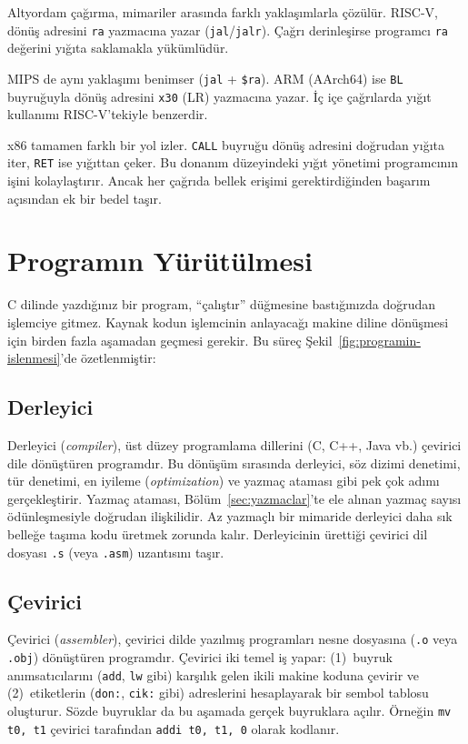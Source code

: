 \begin{karsilastirma}
Altyordam çağırma, mimariler arasında farklı yaklaşımlarla çözülür. RISC-V, dönüş adresini \texttt{ra} yazmacına yazar (\texttt{jal}/\texttt{jalr}). Çağrı derinleşirse programcı \texttt{ra} değerini yığıta saklamakla yükümlüdür.

MIPS de aynı yaklaşımı benimser (\texttt{jal} + \texttt{\$ra}). ARM (AArch64) ise \texttt{BL} buyruğuyla dönüş adresini \texttt{x30} (LR) yazmacına yazar. İç içe çağrılarda yığıt kullanımı RISC-V'tekiyle benzerdir.

x86 tamamen farklı bir yol izler. \texttt{CALL} buyruğu dönüş adresini doğrudan yığıta iter, \texttt{RET} ise yığıttan çeker. Bu donanım düzeyindeki yığıt yönetimi programcının işini kolaylaştırır. Ancak her çağrıda bellek erişimi gerektirdiğinden başarım açısından ek bir bedel taşır.
\end{karsilastirma}

\section{Programın Yürütülmesi}
\label{sec:program-yurutme}

C dilinde yazdığınız bir program, ``çalıştır'' düğmesine bastığınızda doğrudan işlemciye gitmez. Kaynak kodun işlemcinin anlayacağı makine diline dönüşmesi için birden fazla aşamadan geçmesi gerekir. Bu süreç Şekil~\ref{fig:programin-islenmesi}'de özetlenmiştir:

\subsection{Derleyici}
Derleyici (\textit{compiler}), üst düzey programlama dillerini (C, C++, Java vb.) çevirici dile dönüştüren programdır. Bu dönüşüm sırasında derleyici, söz dizimi denetimi, tür denetimi, en iyileme (\textit{optimization}) ve yazmaç ataması gibi pek çok adımı gerçekleştirir. Yazmaç ataması, Bölüm~\ref{sec:yazmaclar}'te ele alınan yazmaç sayısı ödünleşmesiyle doğrudan ilişkilidir. Az yazmaçlı bir mimaride derleyici daha sık belleğe taşıma kodu üretmek zorunda kalır. Derleyicinin ürettiği çevirici dil dosyası \texttt{.s} (veya \texttt{.asm}) uzantısını taşır.

\subsection{Çevirici}
Çevirici (\textit{assembler}), çevirici dilde yazılmış programları nesne dosyasına (\texttt{.o} veya \texttt{.obj}) dönüştüren programdır. Çevirici iki temel iş yapar: (1)~buyruk anımsatıcılarını (\texttt{add}, \texttt{lw} gibi) karşılık gelen ikili makine koduna çevirir ve (2)~etiketlerin (\texttt{don:}, \texttt{cik:} gibi) adreslerini hesaplayarak bir sembol tablosu oluşturur. Sözde buyruklar da bu aşamada gerçek buyruklara açılır. Örneğin \texttt{mv t0, t1} çevirici tarafından \texttt{addi t0, t1, 0} olarak kodlanır.

